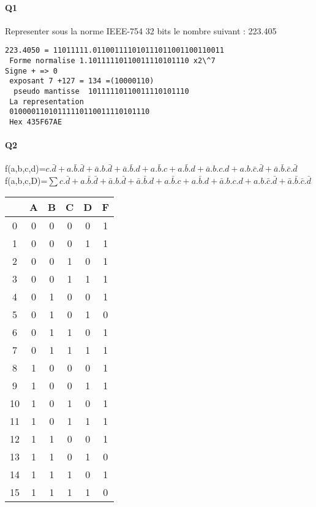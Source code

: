 \paragraph{Q1}

Representer sous la norme IEEE-754 32 bits le nombre suivant : 223.405

\begin{verbatim}223.4050 = 11011111.011001111010111011001100110011
 Forme normalise 1.10111110110011110101110 x2\^7
Signe + => 0
 exposant 7 +127 = 134 =(10000110)
  pseudo mantisse  10111110110011110101110 
 La representation 
 01000011010111110110011110101110
 Hex 435F67AE

\end{verbatim}
\paragraph{Q2}

f(a,b,c,d)=$ c.\bar d + a.\bar b.\bar d + \bar a.b.\bar d + \bar a.\bar b.d  +  a.\bar b.c + a.\bar b.d + \bar a.b.c.d + a.b.\bar c.\bar d + \bar a.\bar b.\bar c.\bar d $
f(a,b,c,D)=$ \sum c.\bar d + a.\bar b.\bar d + \bar a.b.\bar d + \bar a.\bar b.d  +  a.\bar b.c + a.\bar b.d + \bar a.b.c.d + a.b.\bar c.\bar d + \bar a.\bar b.\bar c.\bar d $ 

        \begin{tabular}{|c|c|c|c|c||c|}
    \toprule
         & A & B & C & D & F\\ \midrule0 & 0 & 0 & 0 & 0 & 1\\1 & 0 & 0 & 0 & 1 & 1\\2 & 0 & 0 & 1 & 0 & 1\\3 & 0 & 0 & 1 & 1 & 1\\\midrule4 & 0 & 1 & 0 & 0 & 1\\5 & 0 & 1 & 0 & 1 & 0\\6 & 0 & 1 & 1 & 0 & 1\\7 & 0 & 1 & 1 & 1 & 1\\\midrule8 & 1 & 0 & 0 & 0 & 1\\9 & 1 & 0 & 0 & 1 & 1\\10 & 1 & 0 & 1 & 0 & 1\\11 & 1 & 0 & 1 & 1 & 1\\\midrule12 & 1 & 1 & 0 & 0 & 1\\13 & 1 & 1 & 0 & 1 & 0\\14 & 1 & 1 & 1 & 0 & 1\\15 & 1 & 1 & 1 & 1 & 0\\\bottomrule
        \end{tabular}
        
